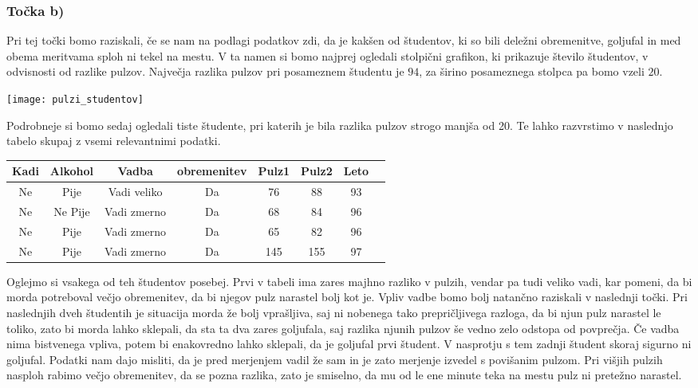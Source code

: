 \documentclass[12pt, letterpaper]{article}
\begin{document}
\subsubsection*{Točka b)} Pri tej točki bomo raziskali, če se nam na podlagi podatkov zdi, da je kakšen od študentov, ki so bili deležni obremenitve, goljufal in med obema meritvama sploh ni tekel na mestu. V ta namen si bomo najprej ogledali stolpični grafikon, ki prikazuje število študentov, v odvisnosti od razlike pulzov. Največja razlika pulzov pri posameznem študentu je $94$, za širino posameznega stolpca pa bomo vzeli $20$.
\begin{center}
\texttt{[image: pulzi\_studentov]}
\end{center}
Podrobneje si bomo sedaj ogledali tiste študente, pri katerih je bila razlika pulzov strogo manjša od 20. Te lahko razvrstimo v naslednjo tabelo skupaj z vsemi relevantnimi podatki.
\begin{center}
\begin{tabular}{| c | c | c | c | c | c | c | c |}
\hline
Kadi & Alkohol & Vadba       & obremenitev & Pulz1 & Pulz2 & Leto \\
\hline \hline
Ne   & Pije    & Vadi veliko & Da          & 76    & 88    & 93 \\
\hline
Ne   & Ne Pije & Vadi zmerno & Da		   & 68    & 84    & 96 \\
\hline
Ne   & Pije    & Vadi zmerno & Da          & 65    & 82    & 96 \\
\hline
Ne   & Pije    & Vadi zmerno & Da          & 145   & 155   & 97 \\
\hline
\end{tabular}
\end{center}
Oglejmo si vsakega od teh študentov posebej. Prvi v tabeli ima zares majhno razliko v pulzih, vendar pa tudi veliko vadi, kar pomeni, da bi morda potreboval večjo obremenitev, da bi njegov pulz narastel bolj kot je. Vpliv vadbe bomo bolj natančno raziskali v naslednji točki. Pri naslednjih dveh študentih je situacija morda že bolj vprašljiva, saj ni nobenega tako prepričljivega razloga, da bi njun pulz narastel le toliko, zato bi morda lahko sklepali, da sta ta dva zares goljufala, saj razlika njunih pulzov še vedno zelo odstopa od povprečja. Če vadba nima bistvenega vpliva, potem bi enakovredno lahko sklepali, da je goljufal prvi študent. V nasprotju s tem zadnji študent skoraj sigurno ni goljufal. Podatki nam dajo misliti, da je pred merjenjem vadil že sam in je zato merjenje izvedel s povišanim pulzom. Pri višjih pulzih nasploh rabimo večjo obremenitev, da se pozna razlika, zato je smiselno, da mu od le ene minute teka na mestu pulz ni pretežno narastel.
\end{document}
